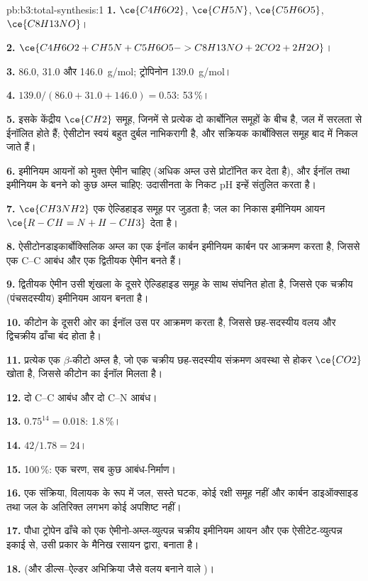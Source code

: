 \begin{solution}{pb:b3:total-synthesis:1}
\textbf{1.} $\ce{C4H6O2}$, $\ce{CH5N}$, $\ce{C5H6O5}$, $\ce{C8H13NO}$।

\textbf{2.} $\ce{C4H6O2 + CH5N + C5H6O5 -> C8H13NO + 2CO2 + 2H2O}$।

\textbf{3.} 86.0, 31.0 और \qty{146.0}{g/mol}; ट्रोपिनोन \qty{139.0}{g/mol}।

\textbf{4.} $139.0/(86.0 + 31.0 + 146.0) = 0.53$: 53\,\%।

\textbf{5.} इसके केंद्रीय $\ce{CH2}$ समूह, जिनमें से प्रत्येक दो कार्बोनिल समूहों के बीच है, जल में
सरलता से ईनॉलित होते हैं; ऐसीटोन स्वयं बहुत दुर्बल नाभिकरागी है, और सक्रियक कार्बोक्सिल
समूह बाद में निकल जाते हैं।

\textbf{6.} इमीनियम आयनों को मुक्त ऐमीन चाहिए (अधिक अम्ल उसे प्रोटॉनित कर देता है), और
ईनॉल तथा इमीनियम के बनने को कुछ अम्ल चाहिए: उदासीनता के निकट pH इन्हें संतुलित करता है।

\textbf{7.} $\ce{CH3NH2}$ एक ऐल्डिहाइड समूह पर जुड़ता है; जल का निकास इमीनियम आयन
$\ce{R-CH=N+H-CH3}$ देता है।

\textbf{8.} ऐसीटोनडाइकार्बोक्सिलिक अम्ल का एक ईनॉल कार्बन इमीनियम कार्बन पर आक्रमण करता है, जिससे
एक C--C आबंध और एक द्वितीयक ऐमीन बनते हैं।

\textbf{9.} द्वितीयक ऐमीन उसी शृंखला के दूसरे ऐल्डिहाइड समूह के साथ संघनित होता है,
जिससे एक चक्रीय (पंचसदस्यीय) इमीनियम आयन बनता है।

\textbf{10.} कीटोन के दूसरी ओर का ईनॉल उस पर आक्रमण करता है, जिससे
छह-सदस्यीय वलय और द्विचक्रीय ढाँचा बंद होता है।

\textbf{11.} प्रत्येक एक $\beta$-कीटो अम्ल है, जो एक चक्रीय छह-सदस्यीय संक्रमण
अवस्था से होकर $\ce{CO2}$ खोता है, जिससे कीटोन का ईनॉल मिलता है।

\textbf{12.} दो C--C आबंध और दो C--N आबंध।

\textbf{13.} $0.75^{14} = 0.018$: 1.8\,\%।

\textbf{14.} $42/1.78 = 24$।

\textbf{15.} 100\,\%: एक चरण, सब कुछ आबंध-निर्माण।

\textbf{16.} एक संक्रिया, विलायक के रूप में जल, सस्ते घटक, कोई रक्षी समूह नहीं और
कार्बन डाइऑक्साइड तथा जल के अतिरिक्त लगभग कोई अपशिष्ट नहीं।

\textbf{17.} पौधा ट्रोपेन ढाँचे को एक ऐमीनो-अम्ल-व्युत्पन्न
चक्रीय इमीनियम आयन और एक ऐसीटेट-व्युत्पन्न इकाई से, उसी प्रकार के मैनिख
रसायन द्वारा, बनाता है।

\textbf{18.}  (और डील्स--ऐल्डर अभिक्रिया जैसे वलय बनाने वाले
)।


\end{solution}
